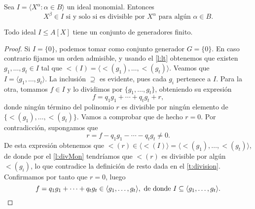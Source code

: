 \begin{lema}\label{l:divMon}
    Sea $I=\langle X^{\alpha} : \alpha \in B\rangle$ un ideal monomial. Entonces
    $$X^{\beta} \in I \text{ si y solo si es divisible por } X^{\alpha} \text{ para algún } \alpha \in B.$$
\end{lema}

\begin{teorema}
    Todo ideal $I\le A[X]$ tiene un conjunto de generadores finito.
\end{teorema}
\begin{proof}
    Si $I=\{0\}$, podemos tomar como conjunto generador $G=\{0\}$. En caso contrario fijamos un orden admisible, y usando el \autoref{l:lt} obtenemos que existen $g_1,\dots, g_t \in I$ tal que $\lt(I) = \langle \lt(g_1),\dots, \lt(g_t)\rangle$. Veamos que $I=\langle g_1,\dots, g_t\rangle$.
    La inclusión $\supseteq$ es evidente, pues cada $g_i$ pertenece a $I$. Para la otra, tomamos $f\in I$ y lo dividimos por $\{g_1,\dots, g_t\}$, obteniendo su expresión
    \begin{equation*}
        f = q_1g_1 + \cdots + q_tg_t + r,
    \end{equation*}
    donde ningún término del polinomio $r$ es divisible por ningún elemento de $\{\lt(g_1), \dots, \lt(g_t)\}$. Vamos a comprobar que de hecho $r=0$. Por contradicción, supongamos que
    \begin{equation*}
        r = f-q_1g_1 - \cdots - q_tg_t \neq 0.
    \end{equation*}
    De esta expresión obtenemos que $\lt(r) \in \langle \lt(I) \rangle = \langle \lt(g_1),\dots, \lt(g_t)\rangle$, de donde por el \autoref{l:divMon} tendríamos que $\lt(r)$ es divisible por algún $\lt(g_i)$, lo que contradice la definición de resto dada en el \autoref{t:division}. Confirmamos por tanto que $r=0$, luego
    $$f = q_1g_1 + \cdots + q_tg_t \in \langle g_1,\dots, g_t\rangle, \text{ de donde } I\subseteq \langle g_1,\dots, g_t\rangle.\qedhere$$
\end{proof}

